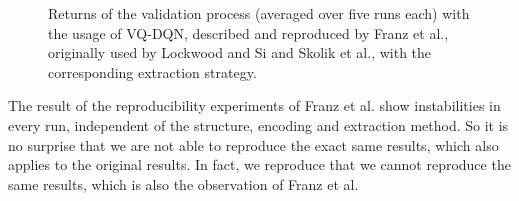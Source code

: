 \begin{figure*}[tb]
\centering
	\scalebox{.62}{}
	\caption{Returns of the validation process (averaged over five runs each) with the usage of \ac{VQ-DQN}, described and reproduced by Franz et al.\autocite{instabilities}, originally used by Lockwood and Si\autocite{lockwood} and Skolik et al.\autocite{skolik}, with the corresponding extraction strategy.}
\label{results}
\end{figure*}

The result of the reproducibility experiments of Franz et al. show instabilities in every run, independent of the structure, encoding and extraction method. 
So it is no surprise that we are not able to reproduce the exact same results, which also applies to the original results.
In fact, we reproduce that we cannot reproduce the same results, which is also the observation of Franz et al. 
